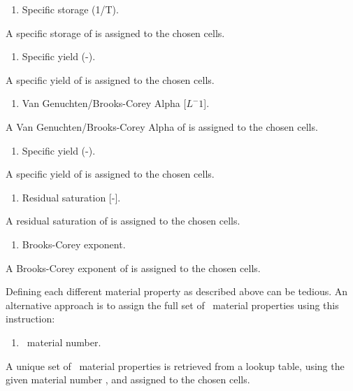     {
        \squish
        \begin{enumerate}
        \item {}  Specific storage (1/T).
        \end{enumerate}
          A specific storage of  is assigned to the chosen cells.
    }

    {
        \squish
        \begin{enumerate}
        \item {}  Specific yield (-).
        \end{enumerate}
          A specific yield of   is assigned to the chosen cells.
    }

    {
        \squish
        \begin{enumerate}
        \item {}  Van Genuchten/Brooks-Corey Alpha [$L^-1$].
        \end{enumerate}
          A Van Genuchten/Brooks-Corey Alpha of  is assigned to the chosen cells.
    }

    {
        \squish
        \begin{enumerate}
        \item {}  Specific yield (-).
        \end{enumerate}
          A specific yield of  is assigned to the chosen cells.
    }

    {
        \squish
        \begin{enumerate}
        \item {}  Residual saturation [-].
        \end{enumerate}
          A residual saturation of  is assigned to the chosen cells.
    }

    {
        \squish
        \begin{enumerate}
        \item {}  Brooks-Corey exponent.
        \end{enumerate}
          A Brooks-Corey exponent of  is assigned to the chosen cells.
    }

Defining each different material property as described above can be tedious.  An alternative approach is to assign the full set of \gwf\ material properties using this instruction:

    {
        \squish
        \begin{enumerate}
        \item {}  \gwf\ material number.
        \end{enumerate}
          A unique set of \gwf\ material properties is retrieved from a lookup table, using the given  material number , and assigned to the chosen cells.
    }

